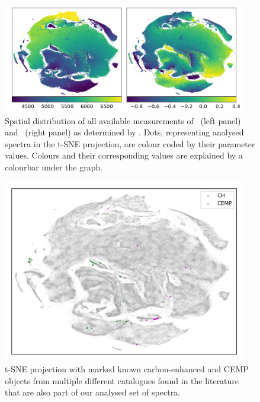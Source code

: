 \begin{figure}
	\centering
	\includegraphics[width=0.95\textwidth]{tsne_params_notitle.png}
	\caption{Spatial distribution of all available measurements of \Teff\ (left panel) and \Feh\ (right panel) as determined by \TC. Dots, representing analysed spectra in the t-SNE projection, are colour coded by their parameter values. Colours and their corresponding values are explained by a colourbar under the graph.}
	\label{fig:tsne_teff_feh}
\end{figure}

\begin{figure}
	\centering
	\includegraphics[width=0.95\textwidth]{tsne_refpapers.png}
	\caption{t-SNE projection with marked known carbon-enhanced and CEMP objects from multiple different catalogues found in the literature that are also part of our analysed set of spectra.}
	\label{fig:tsne_ref_ch}
\end{figure}

